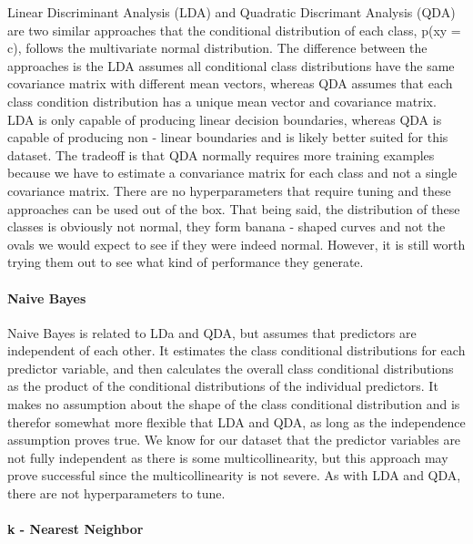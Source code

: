 \documentclass[
]{article}
\begin{document}
Linear Discriminant Analysis (LDA) and Quadratic Discrimant Analysis
(QDA) are two similar approaches that the conditional distribution of
each class, p(x\textbar y = c), follows the multivariate normal
distribution. The difference between the approaches is the LDA assumes
all conditional class distributions have the same covariance matrix with
different mean vectors, whereas QDA assumes that each class condition
distribution has a unique mean vector and covariance matrix. LDA is only
capable of producing linear decision boundaries, whereas QDA is capable
of producing non - linear boundaries and is likely better suited for
this dataset. The tradeoff is that QDA normally requires more training
examples because we have to estimate a convariance matrix for each class
and not a single covariance matrix. There are no hyperparameters that
require tuning and these approaches can be used out of the box. That
being said, the distribution of these classes is obviously not normal,
they form banana - shaped curves and not the ovals we would expect to
see if they were indeed normal. However, it is still worth trying them
out to see what kind of performance they generate.

\hypertarget{naive-bayes}{%
\paragraph{Naive Bayes}\label{naive-bayes}}

Naive Bayes is related to LDa and QDA, but assumes that predictors are
independent of each other. It estimates the class conditional
distributions for each predictor variable, and then calculates the
overall class conditional distributions as the product of the
conditional distributions of the individual predictors. It makes no
assumption about the shape of the class conditional distribution and is
therefor somewhat more flexible that LDA and QDA, as long as the
independence assumption proves true. We know for our dataset that the
predictor variables are not fully independent as there is some
multicollinearity, but this approach may prove successful since the
multicollinearity is not severe. As with LDA and QDA, there are not
hyperparameters to tune.

\hypertarget{k---nearest-neighbor}{%
\paragraph{k - Nearest Neighbor}\label{k---nearest-neighbor}}
\end{document}
